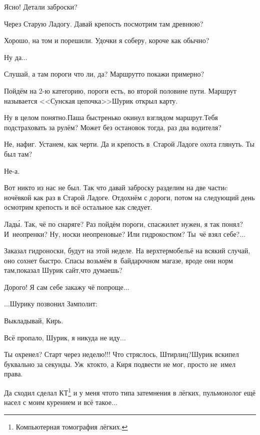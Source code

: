 \diagdash Ясно! Детали заброски?

\diagdash Через Старую Ладогу. Давай крепость посмотрим там древнюю?

\diagdash Хорошо, на том и порешили. Удочки я соберу, короче как обычно?

\diagdash Ну да$\ldots$

\diagdash Слушай, а там пороги что ли, да? Маршрут\sdash то покажи примерно?

\diagdash Пойдём на 2-ю категорию, пороги есть, во второй половине пути. Маршрут называется <<Сунская цепочка>>\mdash Шурик открыл карту.

\diagdash Ну в целом понятно.\mdash Паша быстренько окинул взглядом маршрут.\mdash Тебя подстраховать за рулём? Может без остановок тогда, раз два водителя?

\diagdash Не, нафиг. Устанем, как черти. Да и крепость в~Старой Ладоге охота глянуть. Ты был там?

\diagdash Не-а.

\diagdash Вот никто из нас не был. Так что давай заброску разделим на две части\mdash c ночёвкой как раз в Старой Ладоге. Отдохнём с дороги, потом на следующий день осмотрим крепость и всё остальное как следует.

\diagdash Лад\'{ы}. Так, чё по снаряге? Раз пойдём пороги, спасжилет нужен, я так понял? И~неопренки? Ну, носки неопреновые? Или гидрокостюм? Ты~чё взял себе?$\ldots$

\diagdash Заказал гидроноски, будут на этой неделе. На верх\mdash термобельё на всякий случай, оно сохнет быстро. Спасы возьмём в~байдарочном магазе, вроде они норм там,\mdash показал Шурик сайт,\mdash что думаешь?

\diagdash Дорого! Я сам себе закажу чё попроще$\ldots$

\vspace{0.5cm}
$\ldots$Шурику позвонил Замполит:

\diagdash Выкладывай, Кирь.

\diagdash Всё пропало, Шурик, я никуда не иду$\ldots$

\diagdash Ты охренел? Старт через неделю!!! Что стряслось, Штирлиц?\mdash Шурик вскипел буквально за секунды. Уж~кто\sdash кто, а Киря подвести не мог, просто не~имел права. 

\setcounter{footnote}{0}
\renewcommand*{\thefootnote}{\fnsymbol{footnote}}
\diagdash Да сходил сделал КТ\footnote{Компьютерная томография лёгких.} и у меня что\sdash то типа затемнения в лёгких, пульмонолог ещё насел с моим курением и всё такое$\ldots$


